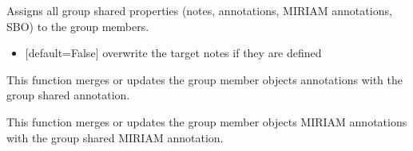 \documentclass[letterpaper,10pt,english]{sphinxmanual}
\begin{document}
\begin{fulllineitems}
\begin{fulllineitems}
\end{fulllineitems}


\begin{fulllineitems}
\label{\detokenize{modules_doc:cbmpy.CBModel.Group.assignAllSharedPropertiesToMembers}}
\pysigstartsignatures
{}
\pysigstopsignatures
\sphinxAtStartPar
Assigns all group shared properties (notes, annotations, MIRIAM annotations, SBO) to the group members.
\begin{itemize}
\item {} 
\sphinxAtStartPar
{} {[}default=False{]} overwrite the target notes if they are defined

\end{itemize}

\end{fulllineitems}


\begin{fulllineitems}
\label{\detokenize{modules_doc:cbmpy.CBModel.Group.assignSharedAnnotationToMembers}}
\pysigstartsignatures
{}
\pysigstopsignatures
\sphinxAtStartPar
This function merges or updates the group member objects annotations with the group shared annotation.

\end{fulllineitems}


\begin{fulllineitems}
\label{\detokenize{modules_doc:cbmpy.CBModel.Group.assignSharedMIRIAMannotationToMembers}}
\pysigstartsignatures
{}
\pysigstopsignatures
\sphinxAtStartPar
This function merges or updates the group member objects MIRIAM annotations with the group shared MIRIAM annotation.


\end{fulllineitems}
\end{fulllineitems}
\end{document}
